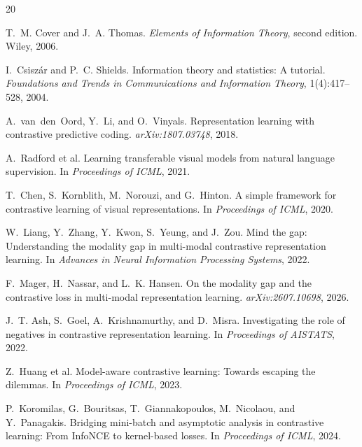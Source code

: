 \documentclass[11pt,a4paper]{article}
\theoremstyle{definition}
\theoremstyle{remark}
\begin{document}
\begin{thebibliography}{20}

T.~M. Cover and J.~A. Thomas.
\newblock \emph{Elements of Information Theory}, second edition.
\newblock Wiley, 2006.

I.~Csisz\'ar and P.~C. Shields.
\newblock Information theory and statistics: A tutorial.
\newblock \emph{Foundations and Trends in Communications and Information Theory}, 1(4):417--528, 2004.

A.~van~den~Oord, Y.~Li, and O.~Vinyals.
\newblock Representation learning with contrastive predictive coding.
\newblock \emph{arXiv:1807.03748}, 2018.

A.~Radford et al.
\newblock Learning transferable visual models from natural language supervision.
\newblock In \emph{Proceedings of ICML}, 2021.

T.~Chen, S.~Kornblith, M.~Norouzi, and G.~Hinton.
\newblock A simple framework for contrastive learning of visual representations.
\newblock In \emph{Proceedings of ICML}, 2020.

W.~Liang, Y.~Zhang, Y.~Kwon, S.~Yeung, and J.~Zou.
\newblock Mind the gap: Understanding the modality gap in multi-modal contrastive representation learning.
\newblock In \emph{Advances in Neural Information Processing Systems}, 2022.

F.~Mager, H.~Nassar, and L.~K. Hansen.
\newblock On the modality gap and the contrastive loss in multi-modal representation learning.
\newblock \emph{arXiv:2607.10698}, 2026.

J.~T. Ash, S.~Goel, A.~Krishnamurthy, and D.~Misra.
\newblock Investigating the role of negatives in contrastive representation learning.
\newblock In \emph{Proceedings of AISTATS}, 2022.

Z.~Huang et al.
\newblock Model-aware contrastive learning: Towards escaping the dilemmas.
\newblock In \emph{Proceedings of ICML}, 2023.

P.~Koromilas, G.~Bouritsas, T.~Giannakopoulos, M.~Nicolaou, and Y.~Panagakis.
\newblock Bridging mini-batch and asymptotic analysis in contrastive learning: From InfoNCE to kernel-based losses.
\newblock In \emph{Proceedings of ICML}, 2024.

\end{thebibliography}
\end{document}
